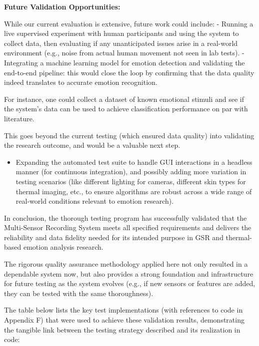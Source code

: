 {{{{{{{{{{{{{{\textbf{Future Validation Opportunities:}

While our current evaluation is extensive, future work could include: - Running
a live supervised experiment with human participants and using the system to
collect data, then evaluating if any unanticipated issues arise in a real-world
environment (e.g., noise from actual human movement not seen in lab tests). -
Integrating a machine learning model for emotion detection and validating the
end-to-end pipeline: this would close the loop by confirming that the data
quality indeed translates to accurate emotion recognition.

For instance, one could collect a dataset of known emotional stimuli and see if
the system's data can be used to achieve classification performance on par with
literature.

This goes beyond the current testing (which ensured data quality) into
validating the research outcome, and would be a valuable next step.

\begin{itemize}

\item Expanding the automated test suite to handle GUI interactions in a
headless manner (for continuous integration), and possibly adding more variation
in testing scenarios (like different lighting for cameras, different skin types
for thermal imaging, etc., to ensure algorithms are robust across a wide range
of real-world conditions relevant to emotion research).

\end{itemize}

In conclusion, the thorough testing program has successfully validated that the
Multi-Sensor Recording System meets all specified requirements and delivers the
reliability and data fidelity needed for its intended purpose in GSR and
thermal-based emotion analysis research.

The rigorous quality assurance methodology applied here not only resulted in a
dependable system now, but also provides a strong foundation and infrastructure
for future testing as the system evolves (e.g., if new sensors or features are
added, they can be tested with the same thoroughness).

The table below lists the key test implementations (with references to code in
Appendix F) that were used to achieve these validation results, demonstrating
the tangible link between the testing strategy described and its realization in
code: \begin{itemize}


\end{itemize}}}}}}}}}}}}}}}

